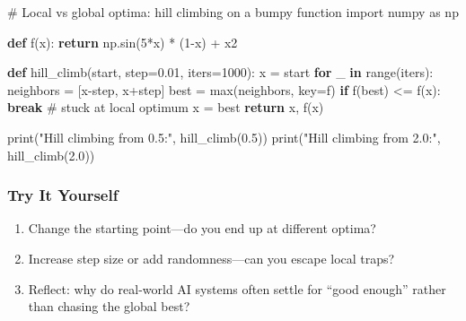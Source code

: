 \documentclass[
  letterpaper,
  DIV=11,
  numbers=noendperiod]{scrreprt}
\newenvironment{Shaded}{\begin{snugshade}}{\end{snugshade}}
\newcommand{\BuiltInTok}[1]{\textcolor[rgb]{0.00,0.23,0.31}{#1}}
\newcommand{\CommentTok}[1]{\textcolor[rgb]{0.37,0.37,0.37}{#1}}
\newcommand{\ControlFlowTok}[1]{\textcolor[rgb]{0.00,0.23,0.31}{\textbf{#1}}}
\newcommand{\DecValTok}[1]{\textcolor[rgb]{0.68,0.00,0.00}{#1}}
\newcommand{\FloatTok}[1]{\textcolor[rgb]{0.68,0.00,0.00}{#1}}
\newcommand{\ImportTok}[1]{\textcolor[rgb]{0.00,0.46,0.62}{#1}}
\newcommand{\KeywordTok}[1]{\textcolor[rgb]{0.00,0.23,0.31}{\textbf{#1}}}
\newcommand{\NormalTok}[1]{\textcolor[rgb]{0.00,0.23,0.31}{#1}}
\newcommand{\OperatorTok}[1]{\textcolor[rgb]{0.37,0.37,0.37}{#1}}
\newcommand{\StringTok}[1]{\textcolor[rgb]{0.13,0.47,0.30}{#1}}
\providecommand{\tightlist}{%
  \setlength{\itemsep}{0pt}\setlength{\parskip}{0pt}}
\begin{document}
\begin{Shaded}
\begin{Highlighting}[]
\CommentTok{\# Local vs global optima: hill climbing on a bumpy function}
\ImportTok{import}\NormalTok{ numpy }\ImportTok{as}\NormalTok{ np}

\KeywordTok{def}\NormalTok{ f(x):}
    \ControlFlowTok{return}\NormalTok{ np.sin(}\DecValTok{5}\OperatorTok{*}\NormalTok{x) }\OperatorTok{*}\NormalTok{ (}\DecValTok{1}\OperatorTok{{-}}\NormalTok{x) }\OperatorTok{+}\NormalTok{ x2}

\KeywordTok{def}\NormalTok{ hill\_climb(start, step}\OperatorTok{=}\FloatTok{0.01}\NormalTok{, iters}\OperatorTok{=}\DecValTok{1000}\NormalTok{):}
\NormalTok{    x }\OperatorTok{=}\NormalTok{ start}
    \ControlFlowTok{for}\NormalTok{ \_ }\KeywordTok{in} \BuiltInTok{range}\NormalTok{(iters):}
\NormalTok{        neighbors }\OperatorTok{=}\NormalTok{ [x}\OperatorTok{{-}}\NormalTok{step, x}\OperatorTok{+}\NormalTok{step]}
\NormalTok{        best }\OperatorTok{=} \BuiltInTok{max}\NormalTok{(neighbors, key}\OperatorTok{=}\NormalTok{f)}
        \ControlFlowTok{if}\NormalTok{ f(best) }\OperatorTok{\textless{}=}\NormalTok{ f(x):}
            \ControlFlowTok{break}  \CommentTok{\# stuck at local optimum}
\NormalTok{        x }\OperatorTok{=}\NormalTok{ best}
    \ControlFlowTok{return}\NormalTok{ x, f(x)}

\BuiltInTok{print}\NormalTok{(}\StringTok{"Hill climbing from 0.5:"}\NormalTok{, hill\_climb(}\FloatTok{0.5}\NormalTok{))}
\BuiltInTok{print}\NormalTok{(}\StringTok{"Hill climbing from 2.0:"}\NormalTok{, hill\_climb(}\FloatTok{2.0}\NormalTok{))}
\end{Highlighting}
\end{Shaded}

\subsubsection{Try It Yourself}\label{try-it-yourself-65}

\begin{enumerate}
\def\labelenumi{\arabic{enumi}.}
\tightlist
\item
  Change the starting point---do you end up at different optima?
\item
  Increase step size or add randomness---can you escape local traps?
\item
  Reflect: why do real-world AI systems often settle for ``good enough''
  rather than chasing the global best?
\end{enumerate}
\end{document}
